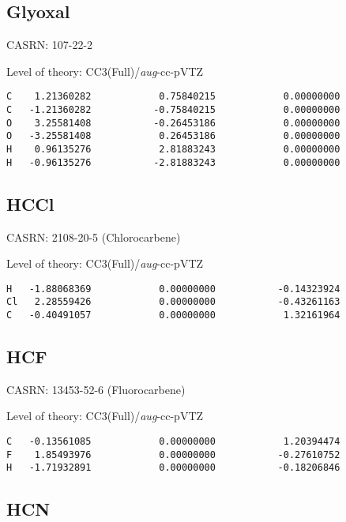 \documentclass[journal=jctcce,manuscript=article,layout=traditional]{achemso}
\newcommand{\AVTZ}{\emph{aug}-cc-pVTZ}
\begin{document}
\subsection{Glyoxal}

CASRN: 107-22-2

\begin{singlespace}
\noindent  Level of theory: CC3(Full)/{\AVTZ}
\begin{verbatim}
C    1.21360282            0.75840215            0.00000000
C   -1.21360282           -0.75840215            0.00000000  
O    3.25581408           -0.26453186            0.00000000
O   -3.25581408            0.26453186            0.00000000  
H    0.96135276            2.81883243            0.00000000
H   -0.96135276           -2.81883243            0.00000000 
\end{verbatim}
\end{singlespace}

\subsection{HCCl}

CASRN: 2108-20-5 (Chlorocarbene)

\begin{singlespace}
\noindent  Level of theory: CC3(Full)/{\AVTZ}
\begin{verbatim}
H   -1.88068369            0.00000000           -0.14323924
Cl   2.28559426            0.00000000           -0.43261163
C   -0.40491057            0.00000000            1.32161964         
\end{verbatim}
\end{singlespace}

\subsection{HCF}

CASRN: 13453-52-6 (Fluorocarbene)

\begin{singlespace}
\noindent  Level of theory: CC3(Full)/{\AVTZ}
\begin{verbatim}
C   -0.13561085            0.00000000            1.20394474
F    1.85493976            0.00000000           -0.27610752
H   -1.71932891            0.00000000           -0.18206846
\end{verbatim}
\end{singlespace}

\subsection{HCN}
\end{document}

